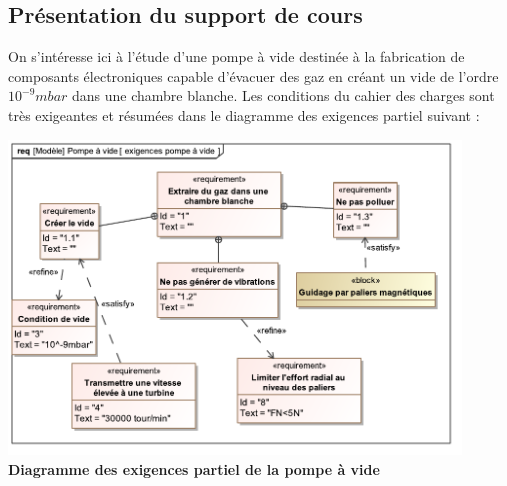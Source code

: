 \documentclass[10pt,fleqn]{article} %
\begin{document}
\subsection{Présentation du support de cours}

\begin{exemple}
On s'intéresse ici à l'étude d'une pompe à vide destinée à la fabrication de composants électroniques capable d'évacuer des gaz en créant un vide de l'ordre $10^{-9}mbar$ dans une chambre blanche. Les conditions du cahier des charges sont très exigeantes et résumées dans le diagramme des exigences partiel suivant : 

\begin{center}
\includegraphics[width=0.9\textwidth]{images/req_pompe.pdf}\\
\textbf{Diagramme des exigences partiel de la pompe à vide}
\end{center}
\end{exemple}
\end{document}
